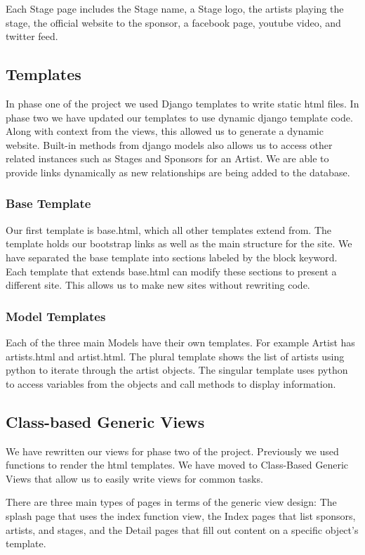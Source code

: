 \documentclass[12pt,english]{scrartcl}
\begin{document}
Each Stage page includes the Stage name, a Stage logo, the artists playing the stage, the official website to the sponsor,
a facebook page, youtube video, and twitter feed.

\subsection{Templates}
In phase one of the project we used Django templates to write static html files. In phase two we have updated our templates to use dynamic django template code. Along with context from the views,
this allowed us to generate a dynamic website. Built-in methods from django models also allows us to access other related instances such as Stages and Sponsors for an Artist. We are able to 
provide links dynamically as new relationships are being added to the database.

\subsubsection{Base Template}
Our first template is base.html, which all other templates extend from. The template holds our bootstrap links as well as the main structure for the site.
We have separated the base template into sections labeled by the block keyword. Each template that extends base.html
can modify these sections to present a different site. This allows us to make new sites without rewriting code.

\subsubsection{Model Templates}
Each of the three main Models have their own templates. For example Artist has artists.html and artist.html. The plural template shows the list of artists using python to
iterate through the artist objects. The singular template uses python to access variables from the objects and call methods to display information.

\subsection{Class-based Generic Views}
We have rewritten our views for phase two of the project. Previously we used functions to render the html templates. We have moved to Class-Based Generic Views
that allow us to easily write views for common tasks. 

There are three main types of pages in terms of the 
generic view design: The splash page that uses the index function view, the Index pages that list
sponsors, artists, and stages, and the Detail pages that fill out content on a specific object's 
template.
\end{document}
